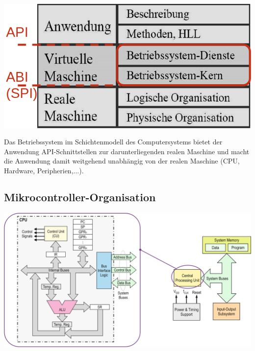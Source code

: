 \begin{center}
	\includegraphics[width=.6\linewidth]{"Images/Schichtmodell.png"}
\end{center}

Das Betriebssystem im Schichtenmodell des Computersystems bietet der Anwendung API-Schnittstellen zur darunterliegenden realen Maschine und macht die Anwendung damit weitgehend unabhängig von der realen Maschine (CPU, Hardware, Peripherien,...).

\subsection{Mikrocontroller-Organisation}

\includegraphics[width=\linewidth]{"Images/MikrocontrollerOrganisation.png"}
